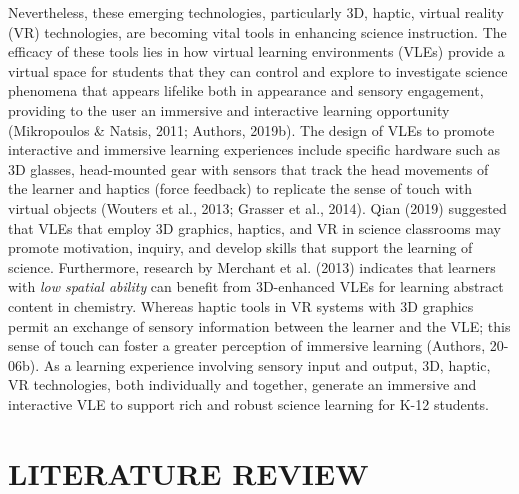 \documentclass[11.5pt]{sig-alternate} %
\begin{document}
\begin{large}
Nevertheless, these emerging technologies, particularly 3D, haptic, virtual reality (VR) technologies, are becoming vital tools in enhancing science instruction. The efficacy of these tools lies in how virtual learning environments (VLEs) provide a virtual space for students that they can control and explore to investigate science phenomena that appears lifelike both in appearance and sensory engagement, providing to the user an immersive and interactive learning opportunity (Mikropoulos \& Natsis, 2011; Authors, 2019b). The design of VLEs to promote interactive and immersive learning experiences include specific hardware such as 3D glasses, head-mounted gear with sensors that track the head movements of the learner and haptics (force feedback) to replicate the sense of touch with virtual objects (Wouters et al., 2013; Grasser et al., 2014). Qian (2019) suggested that VLEs that employ 3D graphics, haptics, and VR in science classrooms may promote motivation, inquiry, and develop skills that support the learning of science. Furthermore, research by Merchant et al. (2013) indicates that learners with \textit{low spatial ability} can benefit from 3D-enhanced VLEs for learning abstract content in chemistry. Whereas haptic tools in VR systems with 3D graphics permit an exchange of sensory information between the learner and the VLE; this sense of touch can foster a greater perception of immersive learning (Authors, 20-06b). As a learning experience involving sensory input and output, 3D, haptic, VR technologies, both individually and together, generate an immersive and interactive VLE to support rich and robust science learning for K-12 students. 

\section*{LITERATURE REVIEW}


\end{large}
\end{document}
